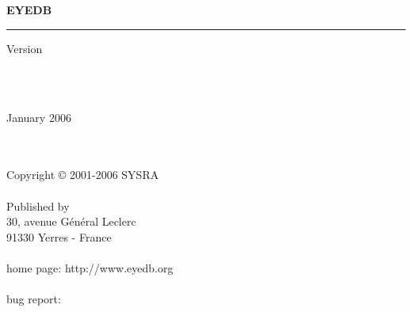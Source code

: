 
\thispagestyle{empty}

\mbox{ }
\\
\vspace{3 cm}
\\
{\bf{\Huge E{\LARGE YE}DB} \hspace{0.cm} {\Huge \mantitle}}
\\
\newcommand{\rulewidth}{17.2cm}
\rule{\rulewidth}{1.6mm}
\begin{flushright}
{\large Version \eyedbversion}
\end{flushright}
\mbox{ }
\\
\vspace{11 cm}
\\
\begin{flushright}
{\large January 2006}
\end{flushright}

\newpage

\thispagestyle{empty}

\mbox{ }
\\
\vspace{1cm}
\\
Copyright {\copyright} 2001-2006 SYSRA
\\
\vspace{1cm}
\\
Published by \sysra
\\
30, avenue G\'en\'eral Leclerc
\\
91330 Yerres - France
\\
\\
home page: http://www.eyedb.org
\\
\\
bug report: \bugreport
